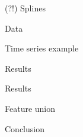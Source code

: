 \documentclass{beamer}
\begin{document}
\begin{frame}{(?!) Splines}

\end{frame}
\begin{frame}{Data}

\end{frame}
\begin{frame}{Time series example}

\end{frame}
\begin{frame}{Results}

\end{frame}
\begin{frame}{Results}

\end{frame}
\begin{frame}{Feature union}

\end{frame}
\begin{frame}{Conclusion}

\end{frame}
\end{document}
